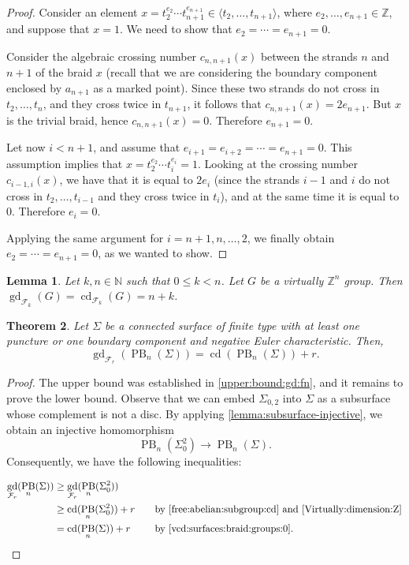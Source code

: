 \documentclass[a4paper,12pt,leqno]{amsart}
\newtheorem{theorem}{Theorem}[section]
\newtheorem{lemma}[theorem]{Lemma}
\theoremstyle{definition}
\newcommand{\Z}{\mathbb{Z}}
\newcommand{\calF}{{\mathcal F}}
\DeclareMathOperator{\cd}{cd}
\DeclareMathOperator{\gd}{gd}
\DeclareMathOperator{\pb}{PB}
\begin{document}
\begin{proof}
Consider an element $x=t_2^{e_2}\cdots t_{n+1}^{e_{n+1}}\in \langle t_2,\ldots,t_{n+1} \rangle$, where $e_2,\ldots,e_{n+1}\in \mathbb Z$, and suppose that $x=1$. We need to show that $e_2=\cdots=e_{n+1}=0$. 

Consider the algebraic crossing number $c_{n,n+1}(x)$ between the strands $n$ and $n+1$ of the braid $x$ (recall that we are considering the boundary component enclosed by $a_{n+1}$ as a marked point). Since these two strands do not cross in $t_2,\ldots,t_n$, and they cross twice in $t_{n+1}$, it follows that $c_{n,n+1}(x)=2e_{n+1}$. But $x$ is the trivial braid, hence $c_{n,n+1}(x)=0$. Therefore $e_{n+1}=0$.

Let now $i<n+1$, and assume that $e_{i+1}=e_{i+2}=\cdots=e_{n+1}=0$. This assumption implies that $x=t_2^{e_2}\cdots t_i^{e_i}=1$. Looking at the crossing number $c_{i-1,i}(x)$, we have that it is equal to $2e_i$ (since the strands $i-1$ and $i$ do not cross in $t_2,\ldots,t_{i-1}$ and they cross twice in $t_i$), and at the same time it is equal to $0$. Therefore $e_i=0$.

Applying the same argument for $i=n+1,n,\ldots,2$, we finally obtain $e_2=\cdots=e_{n+1}=0$, as we wanted to show.
\end{proof}





\begin{lemma}\cite[Theorem~1.1]{PL}\label{Virtually:dimension:Z}
Let $k,n\in \mathbb{N}$ such that $0\leq k< n$. Let $G$ be a virtually $\Z^n$ group. Then  $\gd_{\calF_k}(G)=\cd_{\calF_k}(G)=n+k$.
\end{lemma}

\begin{theorem}
Let \( \Sigma \) be a connected surface of finite type with at least one puncture or one boundary component and negative Euler characteristic. Then, 
\[
\gd_{\calF_r}(\pb_n(\Sigma)) = \cd(\pb_n(\Sigma)) + r.
\]
\end{theorem}
\begin{proof}
The upper bound was established in \cref{upper:bound:gd:fn}, and it remains to prove the lower bound. Observe that we can embed $\Sigma_{0,2}$ into $\Sigma$ as a subsurface whose complement is not a disc. By applying \cref{lemma:subsurface-injective}, we obtain an injective homomorphism
\[
\pb_n(\Sigma_0^{2}) \to \pb_n(\Sigma).
\] 
Consequently, we have the following inequalities:





\begin{alignat}{2}
\gd_{\calF_r}(\pb_n(\Sigma)) &\geq \gd_{\calF_r}(\pb_n(\Sigma_0^{2})) & & \\
&\geq \cd(\pb_n(\Sigma_0^{2})) + r &\quad&\text{by \cref{free:abelian:subgroup:cd} and \cref{Virtually:dimension:Z}} \\
&= \cd(\pb_n(\Sigma)) + r &\quad&\text{by \cref{vcd:surfaces:braid:groups:0}}.
\end{alignat}



\end{proof}
\end{document}
